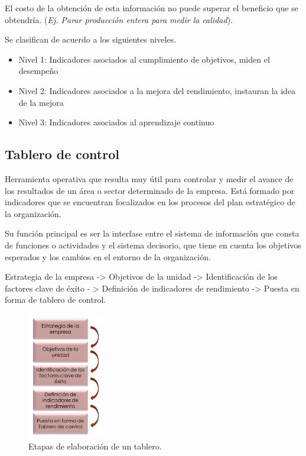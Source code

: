 \documentclass[titlepage,a4paper]{article}
\begin{document}
El costo de la obtención de esta información no puede superar el beneficio que se obtendría. (\textit{Ej. Parar producción entera para medir la calidad}).

Se clasifican de acuerdo a los siguientes niveles.
\begin{itemize}
    \item Nivel 1: Indicadores asociados al cumplimiento de objetivos, miden el desempeño
    \item Nivel 2: Indicadores asociados a la mejora del rendimiento, instauran la idea de la mejora
    \item Nivel 3: Indicadores asociados al aprendizaje continuo
\end{itemize}

\subsection{Tablero de control}
Herramienta operativa que resulta muy útil para controlar y medir el avance de los
resultados de un área o sector determinado de la empresa. Está formado por indicadores
que se encuentran focalizados en los procesos del plan estratégico de la organización.

Su función principal es ser la interfase entre el sistema de información que
consta de funciones o actividades y el sistema decisorio, que tiene en cuenta los objetivos esperados y los
cambios en el entorno de la organización.

Estrategia de la empresa -> Objetivos de la unidad -> Identificación de los factores clave de
éxito - > Definición de indicadores de rendimiento -> Puesta en forma de tablero de control.

\begin{figure}[!htb]
    \centering
    \includegraphics[width=0.3\textwidth]{imagenes/EtapasElaboracionTablero.PNG}
    \caption{Etapas de elaboración de un tablero.}
\end{figure}
\end{document}
